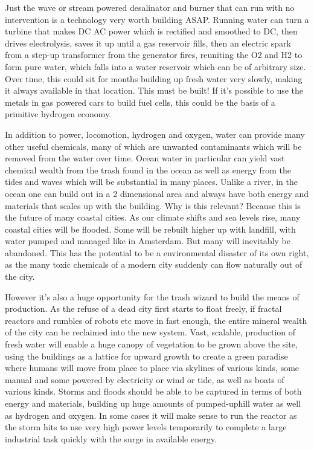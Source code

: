 Just the wave or stream powered desalinator and burner that can run with
no intervention is a technology very worth building ASAP. Running water
can turn a turbine that makes DC AC power which is rectified and
smoothed to DC, then drives electrolysis, saves it up until a gas
reservoir fills, then an electric spark from a step-up transformer from
the generator fires, reuniting the O2 and H2 to form pure water, which
falls into a water reservoir which can be of arbitrary size. Over time,
this could sit for months building up fresh water very slowly, making it
always available in that location. This must be built! If it's possible
to use the metals in gas powered cars to build fuel cells, this could be
the basis of a primitive hydrogen economy.

In addition to power, locomotion, hydrogen and oxygen, water can provide
many other useful chemicals, many of which are unwanted contaminants
which will be removed from the water over time. Ocean water in
particular can yield vast chemical wealth from the trash found in the
ocean as well as energy from the tides and waves which will be
substantial in many places. Unlike a river, in the ocean one can build
out in a 2 dimensional area and always have both energy and materials
that scales up with the building. Why is this relevant? Because this is
the future of many coastal cities. As our climate shifts and sea levels
rise, many coastal cities will be flooded. Some will be rebuilt higher
up with landfill, with water pumped and managed like in Amsterdam. But
many will inevitably be abandoned. This has the potential to be a
environmental disaster of its own right, as the many toxic chemicals of
a modern city suddenly can flow naturally out of the city.

However it's also a huge opportunity for the trash wizard to build the
means of production. As the refuse of a dead city first starts to float
freely, if fractal reactors and rumbles of robots etc move in fast
enough, the entire mineral wealth of the city can be reclaimed into the
new system. Vast, scalable, production of fresh water will enable a huge
canopy of vegetation to be grown above the site, using the buildings as
a lattice for upward growth to create a green paradise where humans will
move from place to place via skylines of various kinds, some manual and
some powered by electricity or wind or tide, as well as boats of various
kinds. Storms and floods should be able to be captured in terms of both
energy and materials, building up huge amounts of pumped-uphill water as
well as hydrogen and oxygen. In some cases it will make sense to run the
reactor as the storm hits to use very high power levels temporarily to
complete a large industrial task quickly with the surge in available
energy.

